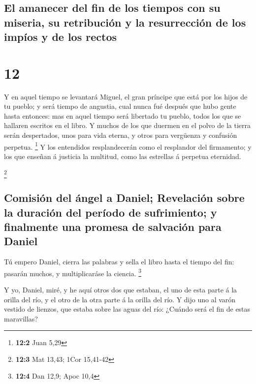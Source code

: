 \hypertarget{el-amanecer-del-fin-de-los-tiempos-con-su-miseria-su-retribuciuxf3n-y-la-resurrecciuxf3n-de-los-impuxedos-y-de-los-rectos}{%
\subsection{El amanecer del fin de los tiempos con su miseria, su
retribución y la resurrección de los impíos y de los
rectos}\label{el-amanecer-del-fin-de-los-tiempos-con-su-miseria-su-retribuciuxf3n-y-la-resurrecciuxf3n-de-los-impuxedos-y-de-los-rectos}}

\hypertarget{section-11}{%
\section{12}\label{section-11}}

 Y en aquel tiempo se levantará Miguel, el gran príncipe
que está por los hijos de tu pueblo; y será tiempo de angustia, cual
nunca fué después que hubo gente hasta entonces: mas en aquel tiempo
será libertado tu pueblo, todos los que se hallaren escritos en el
libro.  Y muchos de los que duermen en el polvo de la
tierra serán despertados, unos para vida eterna, y otros para vergüenza
y confusión perpetua. \footnote{\textbf{12:2} Juan 5,29} 
Y los entendidos resplandecerán como el resplandor del firmamento; y los
que enseñan á justicia la multitud, como las estrellas á perpetua
eternidad.

\footnote{\textbf{12:3} Mat 13,43; 1Cor 15,41-42}

\hypertarget{comisiuxf3n-del-uxe1ngel-a-daniel-revelaciuxf3n-sobre-la-duraciuxf3n-del-peruxedodo-de-sufrimiento-y-finalmente-una-promesa-de-salvaciuxf3n-para-daniel}{%
\subsection{Comisión del ángel a Daniel; Revelación sobre la duración
del período de sufrimiento; y finalmente una promesa de salvación para
Daniel}\label{comisiuxf3n-del-uxe1ngel-a-daniel-revelaciuxf3n-sobre-la-duraciuxf3n-del-peruxedodo-de-sufrimiento-y-finalmente-una-promesa-de-salvaciuxf3n-para-daniel}}

 Tú empero Daniel, cierra las palabras y sella el libro
hasta el tiempo del fin: pasarán muchos, y multiplicaráse la ciencia.
\footnote{\textbf{12:4} Dan 12,9; Apoc 10,4}

 Y yo, Daniel, miré, y he aquí otros dos que estaban, el
uno de esta parte á la orilla del río, y el otro de la otra parte á la
orilla del río.  Y dijo uno al varón vestido de lienzos,
que estaba sobre las aguas del río: ¿Cuándo será el fin de estas
maravillas?

